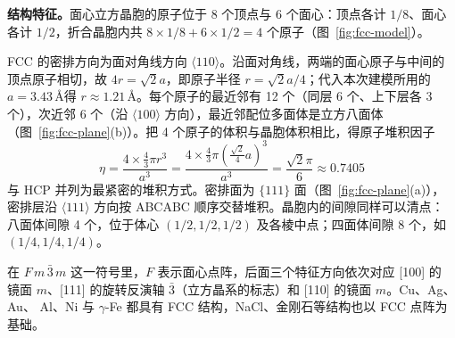 \textbf{结构特征。}面心立方晶胞的原子位于 8 个顶点与 6 个面心：顶点各计 $1/8$、面心各计
$1/2$，折合晶胞内共 $8\times1/8+6\times1/2=4$ 个原子（图~\ref{fig:fcc-model}）。

FCC 的密排方向为面对角线方向 $\langle110\rangle$。沿面对角线，两端的面心原子与中间的
顶点原子相切，故 $4r=\sqrt{2}a$，即原子半径 $r=\sqrt{2}a/4$；代入本次建模所用的
$a=3.43$\,\AA 得 $r\approx1.21$\,\AA。每个原子的最近邻有 12 个（同层 6 个、上下层各
3 个），次近邻 6 个（沿 $\langle100\rangle$ 方向），最近邻配位多面体是立方八面体
（图~\ref{fig:fcc-plane}(b)）。把 4 个原子的体积与晶胞体积相比，得原子堆积因子
\begin{equation}
  \eta=\frac{4\times\frac{4}{3}\pi r^3}{a^3}
    =\frac{4\times\frac{4}{3}\pi\left(\frac{\sqrt{2}}{4}a\right)^3}{a^3}
    =\frac{\sqrt{2}\pi}{6}\approx0.7405
\end{equation}
与 HCP 并列为最紧密的堆积方式。密排面为 $\{111\}$ 面（图~\ref{fig:fcc-plane}(a)），
密排层沿 $\langle111\rangle$ 方向按 ABCABC 顺序交替堆积。晶胞内的间隙同样可以清点：
八面体间隙 4 个，位于体心 $(1/2,1/2,1/2)$ 及各棱中点；四面体间隙 8 个，如
$(1/4,1/4,1/4)$。

在 $F\,m\,\bar3\,m$ 这一符号里，$F$ 表示面心点阵，后面三个特征方向依次对应 [100] 的
镜面 $m$、[111] 的旋转反演轴 $\bar3$（立方晶系的标志）和 [110] 的镜面 $m$。Cu、Ag、Au、
Al、Ni 与 $\gamma$-Fe 都具有 FCC 结构，NaCl、金刚石等结构也以 FCC 点阵为基础。

